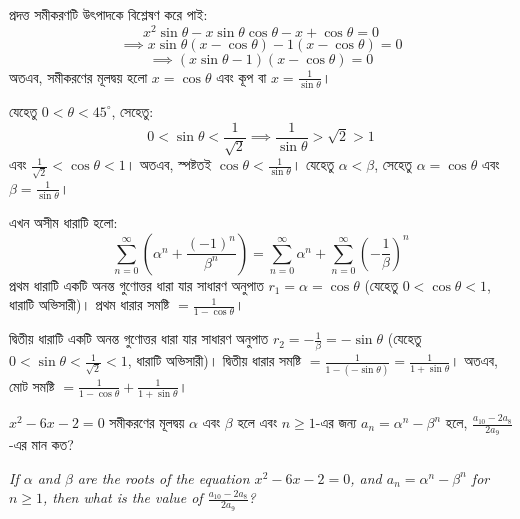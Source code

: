\documentclass[12pt, a4paper]{article}
\begin{document}
\begin{tcolorbox}[solutionbox={সমাধান (Solution)}]
    \noindent
    প্রদত্ত সমীকরণটি উৎপাদকে বিশ্লেষণ করে পাই:
    \[ x^2 \sin\theta - x\sin\theta\cos\theta - x + \cos\theta = 0 \]
    \[ \implies x\sin\theta(x - \cos\theta) - 1(x - \cos\theta) = 0 \]
    \[ \implies (x\sin\theta - 1)(x - \cos\theta) = 0 \]
    অতএব, সমীকরণের মূলদ্বয় হলো $x = \cos\theta$ এবং কূপ বা $x = \frac{1}{\sin\theta}$।
    
    \vspace{0.5em}
    যেহেতু $0 < \theta < 45^\circ$, সেহেতু:
    \[ 0 < \sin\theta < \frac{1}{\sqrt{2}} \implies \frac{1}{\sin\theta} > \sqrt{2} > 1 \]
    এবং $\frac{1}{\sqrt{2}} < \cos\theta < 1$। অতএব, স্পষ্টতই $\cos\theta < \frac{1}{\sin\theta}$। 
    যেহেতু $\alpha < \beta$, সেহেতু $\alpha = \cos\theta$ এবং $\beta = \frac{1}{\sin\theta}$।
    
    \vspace{0.5em}
    এখন অসীম ধারাটি হলো:
    \[ \sum_{n=0}^{\infty} \left(\alpha^n + \frac{(-1)^n}{\beta^n}\right) = \sum_{n=0}^{\infty} \alpha^n + \sum_{n=0}^{\infty} \left(-\frac{1}{\beta}\right)^n \]
    প্রথম ধারাটি একটি অনন্ত গুণোত্তর ধারা যার সাধারণ অনুপাত $r_1 = \alpha = \cos\theta$ (যেহেতু $0 < \cos\theta < 1$, ধারাটি অভিসারী)। 
    প্রথম ধারার সমষ্টি $= \frac{1}{1-\cos\theta}$।
    
    \vspace{0.5em}
    দ্বিতীয় ধারাটি একটি অনন্ত গুণোত্তর ধারা যার সাধারণ অনুপাত $r_2 = -\frac{1}{\beta} = -\sin\theta$ (যেহেতু $0 < \sin\theta < \frac{1}{\sqrt{2}} < 1$, ধারাটি অভিসারী)। 
    দ্বিতীয় ধারার সমষ্টি $= \frac{1}{1 - (-\sin\theta)} = \frac{1}{1+\sin\theta}$।
    অতএব, মোট সমষ্টি $= \frac{1}{1-\cos\theta} + \frac{1}{1+\sin\theta}$।
\end{tcolorbox}
\vspace{1em}

\begin{tcolorbox}[questionbox={প্রশ্ন (Question) 28}]
    \noindent
    $x^2 - 6x - 2 = 0$ সমীকরণের মূলদ্বয় $\alpha$ এবং $\beta$ হলে এবং $n \ge 1$-এর জন্য $a_n = \alpha^n - \beta^n$ হলে, $\frac{a_{10} - 2a_8}{2a_9}$-এর মান কত?
    
    \vspace{0.8em}
    \begin{english}
    \noindent\textit{\color{darkgray}
    If $\alpha$ and $\beta$ are the roots of the equation $x^2 - 6x - 2 = 0$, and $a_n = \alpha^n - \beta^n$ for $n \ge 1$, then what is the value of $\frac{a_{10} - 2a_8}{2a_9}$?
    }
    \end{english}
\end{tcolorbox}
\end{document}
